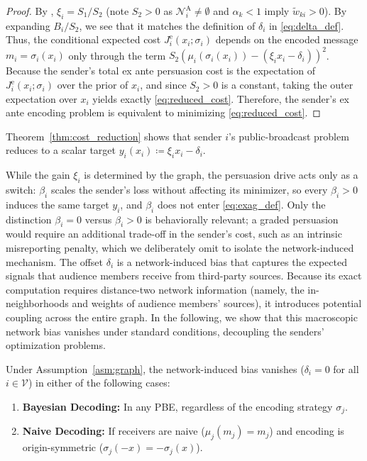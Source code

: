 \documentclass[journal,twoside,web]{ieeecolor}
\begin{document}
\begin{proof}
    By , $\xi_i = S_1/S_2$ (note $S_2>0$ as $\mathcal{N}_i^{\mathrm{A}} \neq \emptyset$ and $\alpha_k < 1$ imply $\widetilde{w}_{ki}>0$). By expanding $B_i/S_2$, we see that it matches the definition of $\delta_i$ in \eqref{eq:delta_def}. Thus, the conditional expected cost $J^{\mathrm{e}}_i(x_i; \sigma_i)$ depends on the encoded message $m_i = \sigma_i(x_i)$ only through the term $S_2\left(\mu_i(\sigma_i(x_i)) - (\xi_i x_i - \delta_i)\right)^2$. Because the sender's total ex ante persuasion cost is the expectation of $J^{\mathrm{e}}_i(x_i; \sigma_i)$ over the prior of $x_i$, and since $S_2 > 0$ is a constant, taking the outer expectation over $x_i$ yields exactly \eqref{eq:reduced_cost}. Therefore, the sender's ex ante encoding problem is equivalent to minimizing \eqref{eq:reduced_cost}.
\end{proof}

Theorem~\ref{thm:cost_reduction} shows that sender $i$'s public-broadcast problem reduces to a scalar target $y_i(x_i)\coloneqq\xi_i x_i-\delta_i$.

While the gain $\xi_i$ is determined by the graph, the persuasion drive acts only as a switch: $\beta_i$ scales the sender's loss without affecting its minimizer, so every $\beta_i>0$ induces the same target $y_i$, and $\beta_i$ does not enter \eqref{eq:exag_def}. Only the distinction $\beta_i=0$ versus $\beta_i>0$ is behaviorally relevant; a graded persuasion would require an additional trade-off in the sender's cost, such as an intrinsic misreporting penalty, which we deliberately omit to isolate the network-induced mechanism.
The offset $\delta_i$ is a network-induced bias that captures the expected signals that audience members receive from third-party sources. Because its exact computation requires distance-two network information (namely, the in-neighborhoods and weights of audience members' sources), it introduces potential coupling across the entire graph. In the following, we show that this macroscopic network bias vanishes under standard conditions, decoupling the senders' optimization problems.

\begin{proposition}
    \label{prop:vanishing_bias}
    Under Assumption~\ref{asm:graph}, the network-induced bias vanishes ($\delta_i = 0$ for all $i \in \mathcal{V}$) in either of the following cases:
    \begin{enumerate}[wide]
        \item \textbf{Bayesian Decoding:} In any PBE, regardless of the encoding strategy $\sigma_j$.\label{prop:vanishing_bias:1}
        \item \textbf{Naive Decoding:} If receivers are naive ($\mu_j(m_j) = m_j$) and encoding is origin-symmetric ($\sigma_j(-x) = -\sigma_j(x)$).\label{prop:vanishing_bias:2}
    \end{enumerate}
\end{proposition}
\end{document}
